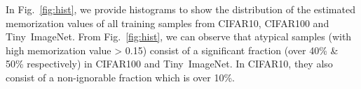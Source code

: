 \newpage
In Fig.~\ref{fig:hist}, we provide histograms to show the distribution of the estimated memorization values of all training samples from CIFAR10, CIFAR100 and Tiny~ImageNet. From Fig.~\ref{fig:hist}, we can observe that atypical samples (with high memorization value > 0.15) consist of a significant fraction (over 40\% \& 50\% respectively) in CIFAR100 and Tiny~ImageNet. In CIFAR10, they also consist of a non-ignorable fraction which is over 10\%.
\begin{figure}[h]
\centering
{}
\hspace*{0.0cm}
\end{figure}
